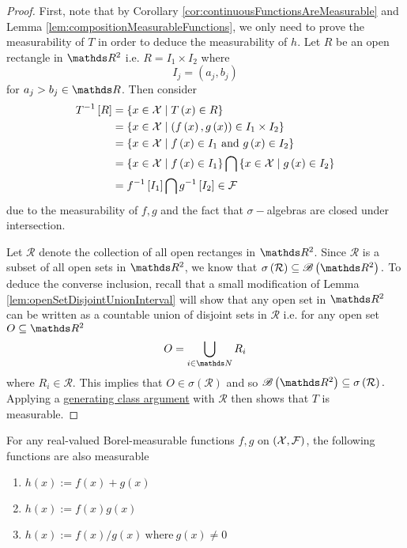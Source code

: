 \begin{proof}
First, note that by Corollary \ref{cor:continuousFunctionsAreMeasurable}
and Lemma \ref{lem:compositionMeasurableFunctions}, we only need
to prove the measurability of $T$ in order to deduce the measurability
of $h$. Let $R$ be an open rectangle in $\R^{2}$ i.e. $R=I_{1}\times I_{2}$
where
\[
I_{j}=\left(a_{j},b_{j}\right)
\]
for $a_{j}>b_{j}\in\R$. Then consider 
\begin{align*}
T^{-1}\left[R\right] & =\left\{ x\in\mathcal{X}\mid T\left(x\right)\in R\right\} \\
 & =\left\{ x\in\mathcal{X}\mid\left(f\left(x\right),g\left(x\right)\right)\in I_{1}\times I_{2}\right\} \\
 & =\left\{ x\in\mathcal{X}\mid f\left(x\right)\in I_{1}\text{ and }g\left(x\right)\in I_{2}\right\} \\
 & =\left\{ x\in\mathcal{X}\mid f\left(x\right)\in I_{1}\right\} \bigcap\left\{ x\in\mathcal{X}\mid g\left(x\right)\in I_{2}\right\} \\
 & =f^{-1}\left[I_{1}\right]\bigcap g^{-1}\left[I_{2}\right]\in\mathcal{F}
\end{align*}
due to the measurability of $f,g$ and the fact that $\sigma-$algebras
are closed under intersection.

Let $\mathcal{R}$ denote the collection of all open rectanges in
$\R^{2}$. Since $\mathcal{R}$ is a subset of all open sets in $\R^{2}$,
we know that $\sigma\left(\mathcal{R}\right)\subseteq\borel\left(\R^{2}\right).$
To deduce the converse inclusion, recall that a small modification
of Lemma \ref{lem:openSetDisjointUnionInterval} will show that any
open set in $\R^{2}$ can be written as a countable union of disjoint
sets in $\mathcal{R}$ i.e. for any open set $O\subseteq\R^{2}$
\[
O=\bigcup_{i\in\N}R_{i}
\]
where $R_{i}\in\mathcal{R}.$ This implies that $O\in\sigma\left(\mathcal{R}\right)$
and so $\borel\left(\R^{2}\right)\subseteq\sigma\left(\mathcal{R}\right).$
Applying a \hyperref[thm:genericGeneratingClassArgument]{generating class argument}
with $\mathcal{R}$ then shows that $T$ is measurable.
\end{proof}
\begin{cor}
\label{cor:examplesBinaryOpsMeasFunc}For any real-valued Borel-measurable
functions $f,g$ on $\left(\mathcal{X},\mathcal{F}\right)$, the following
functions are also measurable

\begin{enumerate}[label=(\roman*),leftmargin=.1\linewidth,rightmargin=.4\linewidth]
	\item $ h(x) := f(x) + g(x) $
	\item $ h(x) := f(x)g(x) $
	\item $ h(x) := f(x)/g(x)\ \mathrm{where} \ g(x)\neq 0 $
\end{enumerate}
\end{cor}

